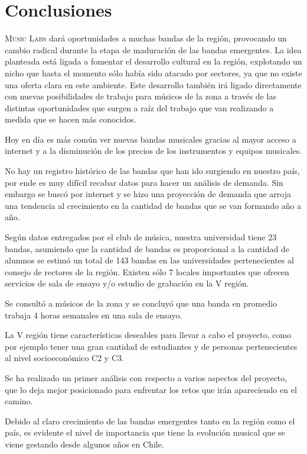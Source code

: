 \section{Conclusiones}

\textsc{Music Labs} dará oportunidades a muchas
bandas de la región, provocando un cambio radical
durante la etapa de maduración de las bandas emergentes.
La idea planteada está ligada a fomentar el desarrollo cultural
en la región, explotando un nicho que hasta el momento
sólo había sido atacado por sectores, ya que no existe
una oferta clara en este ambiente. Este desarrollo
también irá ligado directamente con nuevas
posibilidades de trabajo para músicos de la zona a través
de las distintas oportunidades que surgen a raíz
del trabajo que van realizando a medida que se
hacen más conocidos.


Hoy en día es más común ver nuevas bandas musicales gracias al mayor acceso a internet y a la disminución
de los precios de los instrumentos y equipos musicales.

No hay un registro histórico de las bandas que han ido surgiendo en nuestro país, por ende es muy difícil
recabar datos para hacer un análisis de demanda. Sin embargo se buscó por internet y se hizo una proyección
de demanda que arroja una tendencia  al crecimiento en la cantidad de bandas que se van formando año a año.

Según datos entregados por el club de música, nuestra universidad tiene 23 bandas, asumiendo que la cantidad de bandas es
proporcional a la cantidad de alumnos se estimó un total de 143 bandas en las universidades pertenecientes al consejo de rectores de
la región. Existen sólo 7 locales importantes que ofrecen servicios de sala de ensayo y/o estudio de grabación en la V región.

Se consultó a músicos de la zona y se concluyó que una banda en promedio trabaja 4 horas semanales en una sala de ensayo.

 
La V región tiene características deseables para llevar a cabo el proyecto, como por ejemplo tener una
gran cantidad de estudiantes y de personas pertenecientes al nivel socioeconómico C2 y C3. 



Se ha realizado un primer análisis con respecto a varios
aspectos del proyecto, que lo deja mejor
posicionado para enfrentar los retos que irán apareciendo en
el camino.

Debido al claro crecimiento de las bandas emergentes
tanto en la región como el país, es evidente
el nivel de importancia que tiene la evolución musical que se viene 
gestando desde algunos años en Chile.

